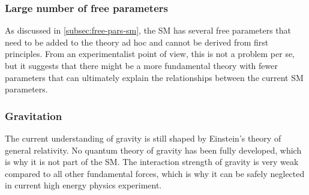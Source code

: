 

\subsubsection{Large number of free parameters}
As discussed in \cref{subsec:free-pars-sm}, the SM has several free parameters that need to be added to the theory ad hoc and cannot be derived from first principles. 
From an experimentalist point of view, this is not a problem per se, but it suggests that there might be a more fundamental theory with fewer parameters that can ultimately explain the relationships between the current SM parameters.


\subsubsection{Gravitation}
The current understanding of gravity is still shaped by Einstein's theory of general relativity. No quantum theory of gravity has been fully developed, which is why it is not part of the SM. 
The interaction strength of gravity is very weak compared to all other fundamental forces, which is why it can be safely neglected in current high energy physics experiment.


